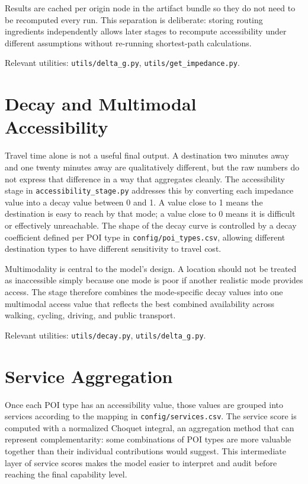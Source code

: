 \documentclass[11pt]{article}
\begin{document}
Results are cached per origin node in the artifact bundle so they do not need to be recomputed every run. This separation is deliberate: storing routing ingredients independently allows later stages to recompute accessibility under different assumptions without re-running shortest-path calculations.

Relevant utilities: \texttt{utils/delta\_g.py}, \texttt{utils/get\_impedance.py}.

\section{Decay and Multimodal Accessibility}

Travel time alone is not a useful final output. A destination two minutes away and one twenty minutes away are qualitatively different, but the raw numbers do not express that difference in a way that aggregates cleanly. The accessibility stage in \texttt{accessibility\_stage.py} addresses this by converting each impedance value into a decay value between 0 and 1. A value close to 1 means the destination is easy to reach by that mode; a value close to 0 means it is difficult or effectively unreachable. The shape of the decay curve is controlled by a decay coefficient defined per POI type in \texttt{config/poi\_types.csv}, allowing different destination types to have different sensitivity to travel cost.

Multimodality is central to the model's design. A location should not be treated as inaccessible simply because one mode is poor if another realistic mode provides access. The stage therefore combines the mode-specific decay values into one multimodal access value that reflects the best combined availability across walking, cycling, driving, and public transport.

Relevant utilities: \texttt{utils/decay.py}, \texttt{utils/delta\_g.py}.

\section{Service Aggregation}

Once each POI type has an accessibility value, those values are grouped into services according to the mapping in \texttt{config/services.csv}. The service score is computed with a normalized Choquet integral, an aggregation method that can represent complementarity: some combinations of POI types are more valuable together than their individual contributions would suggest. This intermediate layer of service scores makes the model easier to interpret and audit before reaching the final capability level.
\end{document}
